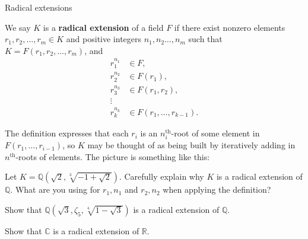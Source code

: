 \begin{section}{Radical extensions}
\begin{definition}
We say $K$ is a \textbf{radical extension} of a field $F$ if there exist nonzero elements $r_1,r_2,\ldots,r_m\in K$ and positive integers $n_1,n_2\ldots,n_m$ such that $K = F(r_1,r_2,\ldots,r_m)$, and 
\begin{align*}
 r_1^{n_1} &\in F,\\
 r_2^{n_2} &\in F(r_1),\\
 r_3^{n_3} &\in F(r_1,r_2),\\
 \vdots & \\
 r_k^{n_k} &\in F(r_1,\ldots,r_{k-1}).
\end{align*}
\end{definition}
The definition expresses that each $r_i$ is an $n_i^\text{th}$-root of some element in $F(r_1,\ldots,r_{i-1})$, so $K$ may be thought of as being built by iteratively adding in $n^\text{th}$-roots of elements. The picture is something like this:
\begin{center}
\end{center}

\begin{problem}
Let $K= \mathbb{Q}\left(\sqrt{2},\sqrt[3]{-1 + \sqrt{2}}\right)$. Carefully explain why $K$ is a radical extension of $\mathbb{Q}$. What are you using for $r_1,n_1$ and $r_2, n_2$ when applying the definition?
\end{problem}

\begin{problem}
Show that  $\mathbb{Q}\left(\sqrt{3},\zeta_5,\sqrt[4]{1 - \sqrt{3}}\right)$ is a radical extension of $\mathbb{Q}$.
\end{problem}

\begin{problem}
Show that $\mathbb{C}$ is a radical extension of $\mathbb{R}$.
\end{problem}
\end{section}

